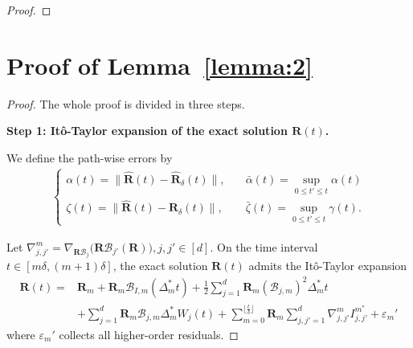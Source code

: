 \documentclass[11pt, a4paper, onecolumn]{article}
\newcommand{\m}{m}
\newcommand{\bfR}{\mathbf{R}}
\newcommand{\B}{\mathcal{B}}
\newcommand{\hatR}{\widehat{\bfR}}
\newcommand{\ms}{{m^*}}
\newcommand{\BIms}{{\B_{I,\m}}}
\newcommand{\Bjms}{{\B_{j,\m}}}
\newcommand{\Dms}{{\Delta^{*}_{m}}}
\newcommand{\njjpms}{ {\nabla_{j,j'}^{\m}} }
\newcommand{\Ijjpms}{ {I_{j,j'}^{\ms}} }
\newcommand{\sumub}{{\lfloor \frac{t}{\delta} \rfloor}}
\newcommand{\half}{{\frac{1}{2}}}
\newcommand{\Rms}{{\bfR_\m}}
\newcommand{\eprm}{\varepsilon_m'}
\newcommand{\suptpt}{\sup_{0 \le t'\le t}}
\newcommand{\Der}[4]{
  #1_{#2}\bigl(#3(#4)\bigr)
}
\begin{document}
\begin{appendices}
\begin{proof}
\end{proof}

\section{Proof of Lemma~\ref{lemma:2}}\label{app:lemma2}
\begin{proof} The whole proof is divided in three steps. \medskip

\noindent\textbf{Step 1:  It\^o-Taylor expansion of the exact solution $\bfR(t)$.} 


We define the path-wise errors by
\begin{align*}
    \begin{cases}
        \alpha(t) = \|\hatR(t) - \hatR_\delta(t)\|, &\quad \bar \alpha(t) = \suptpt \alpha(t) \\
        \zeta(t)  = \|\hatR(t) - \hatR_\delta(t)\|, &\quad \bar \zeta(t) = \suptpt \gamma(t).
    \end{cases}
\end{align*}

Let $\njjpms = \Der{\nabla}{\bfR \B_j}{\bfR \B_{j'}}{\bfR},  j,j'\in [d]$. On the time interval $t\in[m\delta,(m+1)\delta]$, the exact solution $\bfR(t)$ admits the It\^o-Taylor expansion
\begin{align*}
     \bfR(t) = & \bfR_m + \Rms \BIms (
     \Dms t) + \half \sum_{j=1}^d \Rms (\Bjms)^2 \Dms t  \\
     & + \sum_{j=1}^d\Rms \Bjms \Dms W_j(t) + \sum_{m=0}^{\sumub} \Rms \sum_{j,j'=1}^d \njjpms \Ijjpms + \eprm 
\end{align*}
where $\eprm$ collects all higher-order residuals.


\end{proof}
\end{appendices}
\end{document}
